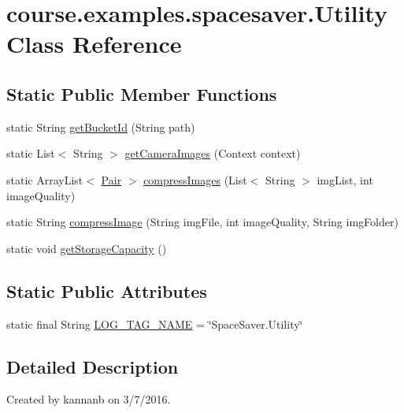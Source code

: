\hypertarget{classcourse_1_1examples_1_1spacesaver_1_1_utility}{}\section{course.\+examples.\+spacesaver.\+Utility Class Reference}
\label{classcourse_1_1examples_1_1spacesaver_1_1_utility}
\subsection*{Static Public Member Functions}
\begin{DoxyCompactItemize}
\item 
static String \hyperlink{classcourse_1_1examples_1_1spacesaver_1_1_utility_afb38a3ff9ea902240c74adad9d975b80}{get\+Bucket\+Id} (String path)
\item 
static List$<$ String $>$ \hyperlink{classcourse_1_1examples_1_1spacesaver_1_1_utility_a7d516823eb324565737ea69a39e604f9}{get\+Camera\+Images} (Context context)
\item 
static Array\+List$<$ \hyperlink{classcourse_1_1examples_1_1spacesaver_1_1_pair}{Pair} $>$ \hyperlink{classcourse_1_1examples_1_1spacesaver_1_1_utility_a5029adf50e50346e2bb08bb1557ed064}{compress\+Images} (List$<$ String $>$ img\+List, int image\+Quality)
\item 
static String \hyperlink{classcourse_1_1examples_1_1spacesaver_1_1_utility_a8f1697a3c166596b60f83c21d23162fb}{compress\+Image} (String img\+File, int image\+Quality, String img\+Folder)
\item 
static void \hyperlink{classcourse_1_1examples_1_1spacesaver_1_1_utility_a6884eae5b4f555bb793d5411f94d72f8}{get\+Storage\+Capacity} ()
\end{DoxyCompactItemize}
\subsection*{Static Public Attributes}
\begin{DoxyCompactItemize}
\item 
static final String \hyperlink{classcourse_1_1examples_1_1spacesaver_1_1_utility_a306cf6f2267973d242405123fc51c775}{L\+O\+G\+\_\+\+T\+A\+G\+\_\+\+N\+A\+M\+E} = \char`\"{}Space\+Saver.\+Utility\char`\"{}
\end{DoxyCompactItemize}


\subsection{Detailed Description}
Created by kannanb on 3/7/2016. 

